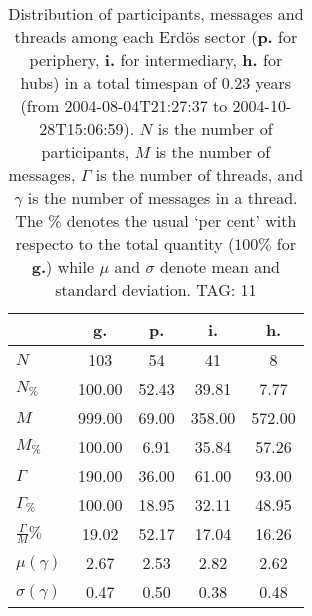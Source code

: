 \begin{table}[h!]
\begin{center}
\begin{tabular}{| l | c | c | c | c |}\hline
 & g. & p. & i. & h. \\\hline
$N$ & 103  & 54  & 41  & 8 \\\hline
$N_{\%}$ & 100.00  & 52.43  & 39.81  & 7.77 \\\hline
$M$ & 999.00  & 69.00  & 358.00  & 572.00 \\\hline
$M_{\%}$ & 100.00  & 6.91  & 35.84  & 57.26 \\\hline
$\Gamma$ & 190.00  & 36.00  & 61.00  & 93.00 \\\hline
$\Gamma_{\%}$ & 100.00  & 18.95  & 32.11  & 48.95 \\\hline
$\frac{\Gamma}{M}\%$ & 19.02  & 52.17  & 17.04  & 16.26 \\\hline
$\mu(\gamma)$ & 2.67  & 2.53  & 2.82  & 2.62 \\\hline
$\sigma(\gamma)$ & 0.47  & 0.50  & 0.38  & 0.48 \\\hline
\end{tabular}
\caption{Distribution of participants, messages and threads among each Erd\"os sector ({\bf p.} for periphery, {\bf i.} for intermediary, 
    {\bf h.} for hubs) in a total timespan of 0.23 years (from 2004-08-04T21:27:37 to 2004-10-28T15:06:59). $N$ is the number of participants, $M$ is the number of messages, $\Gamma$ is the number of threads, and $\gamma$ is the number of messages in a thread.
    The \% denotes the usual `per cent' with respecto to the total quantity ($100\%$ for {\bf g.})
    while $\mu$ and $\sigma$ denote mean and standard deviation. TAG: 11}
\end{center}
\end{table}
